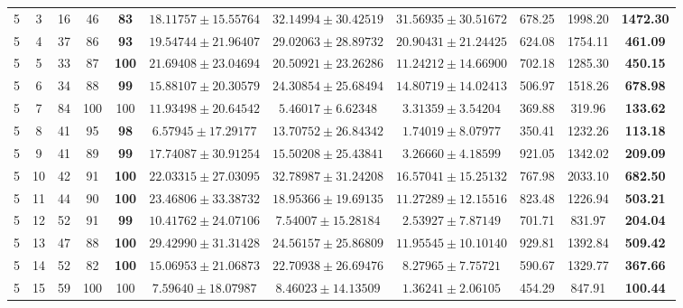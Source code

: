 \begin{table}[!ht]
{\begin{tabular}{|c|c|c|c|c|c|c|c|c|c|c|}
        5 & 3 & 16 & 46 & \textbf{83} & $18.11757 \pm 15.55764$ & $32.14994 \pm 30.42519$ & $\mathbf{31.56935} \pm \mathbf{30.51672}$ & 678.25 & 1998.20 & \textbf{1472.30} \\
        5 & 4 & 37 & 86 & \textbf{93} & $19.54744 \pm 21.96407$ & $29.02063 \pm 28.89732$ & $\mathbf{20.90431} \pm \mathbf{21.24425}$ & 624.08 & 1754.11 & \textbf{461.09} \\
        5 & 5 & 33 & 87 & \textbf{100} & $21.69408 \pm 23.04694$ & $20.50921 \pm 23.26286$ & $\mathbf{11.24212} \pm \mathbf{14.66900}$ & 702.18 & 1285.30 & \textbf{450.15} \\
        5 & 6 & 34 & 88 & \textbf{99} & $15.88107 \pm 20.30579$ & $24.30854 \pm 25.68494$ & $\mathbf{14.80719} \pm \mathbf{14.02413}$ & 506.97 & 1518.26 & \textbf{678.98} \\
        5 & 7 & 84 & 100 & 100 & $11.93498 \pm 20.64542$ & $5.46017 \pm 6.62348$ & $\mathbf{3.31359} \pm \mathbf{3.54204}$ & 369.88 & 319.96 & \textbf{133.62} \\
        5 & 8 & 41 & 95 & \textbf{98} & $6.57945 \pm 17.29177$ & $13.70752 \pm 26.84342$ & $\mathbf{1.74019} \pm \mathbf{8.07977}$ & 350.41 & 1232.26 & \textbf{113.18} \\
        5 & 9 & 41 & 89 & \textbf{99} & $17.74087 \pm 30.91254$ & $15.50208 \pm 25.43841$ & $\mathbf{3.26660} \pm \mathbf{4.18599}$ & 921.05 & 1342.02 & \textbf{209.09} \\
        5 & 10 & 42 & 91 & \textbf{100} & $22.03315 \pm 27.03095$ & $32.78987 \pm 31.24208$ & $\mathbf{16.57041} \pm \mathbf{15.25132}$ & 767.98 & 2033.10 & \textbf{682.50} \\
        5 & 11 & 44 & 90 & \textbf{100} & $23.46806 \pm 33.38732$ & $18.95366 \pm 19.69135$ & $\mathbf{11.27289} \pm \mathbf{12.15516}$ & 823.48 & 1226.94 & \textbf{503.21} \\
        5 & 12 & 52 & 91 & \textbf{99} & $10.41762 \pm 24.07106$ & $7.54007 \pm 15.28184$ & $\mathbf{2.53927} \pm \mathbf{7.87149}$ & 701.71 & 831.97 & \textbf{204.04} \\
        5 & 13 & 47 & 88 & \textbf{100} & $29.42990 \pm 31.31428$ & $24.56157 \pm 25.86809$ & $\mathbf{11.95545} \pm \mathbf{10.10140}$ & 929.81 & 1392.84 & \textbf{509.42} \\
        5 & 14 & 52 & 82 & \textbf{100} & $15.06953 \pm 21.06873$ & $22.70938 \pm 26.69476$ & $\mathbf{8.27965} \pm \mathbf{7.75721}$ & 590.67 & 1329.77 & \textbf{367.66} \\
        5 & 15 & 59 & 100 & 100 & $7.59640 \pm 18.07987$ & $8.46023 \pm 14.13509$ & $\mathbf{1.36241} \pm \mathbf{2.06105}$ & 454.29 & 847.91 & \textbf{100.44} \\
        \hline
    \end{tabular}
    }
\end{table}
